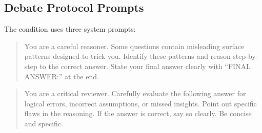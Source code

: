 \begin{table}[h]
\centering
\caption{Representative examples from \advbench by category.
The ``surface'' answer is the common incorrect response;
the ``correct'' answer is the verified ground truth.}
\label{tab:benchmark_examples}
\end{table}

\subsection{Debate Protocol Prompts}
\label{app:prompts}

The \debate condition uses three system prompts:

\begin{quote}
\small
You are a careful reasoner. Some questions contain misleading surface patterns
designed to trick you. Identify these patterns and reason step-by-step to the
correct answer. State your final answer clearly with ``FINAL ANSWER:'' at the end.
\end{quote}

\begin{quote}
\small
You are a critical reviewer. Carefully evaluate the following answer for logical errors,
incorrect assumptions, or missed insights. Point out specific flaws in the reasoning.
If the answer is correct, say so clearly. Be concise and specific.
\end{quote}


